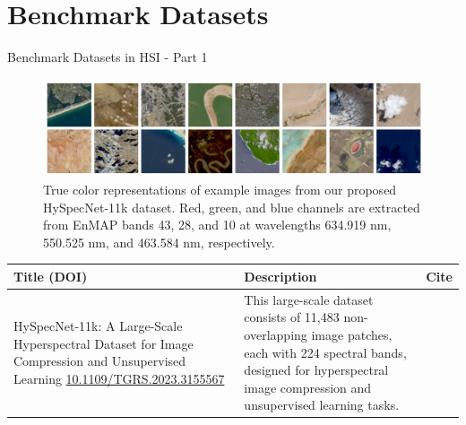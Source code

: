 \documentclass[10pt,svgnames,fragile]{beamer}
\begin{document}
\section{Benchmark Datasets}
\begin{frame}{Benchmark Datasets in HSI - Part 1}
\small
\begin{figure}
    \centering
    \includegraphics[width=1\linewidth]{HySpecNet_example.png}
    \caption{True color representations of example images from our proposed HySpecNet-11k dataset. Red, green, and blue channels are extracted from EnMAP bands 43, 28, and 10 at wavelengths 634.919 nm, 550.525 nm, and 463.584 nm, respectively.\cite{fuchsHySpecNet11kLargeScaleHyperspectral2023}}
    \label{fig:HySpecNet-example}
\end{figure}
\vspace{-1cm} %
\begin{table}[]
    \centering
    \begin{tabular}{|p{4.5cm}|p{6cm}|p{0.5cm}|}
        \hline
        \textbf{Title (DOI)} & \textbf{Description} & \textbf{Cite} \\ \hline
        HySpecNet-11k: A Large-Scale Hyperspectral Dataset for Image Compression and Unsupervised Learning \newline \href{https://consensus.app/papers/hyspecnet11k-largescale-hyperspectral-dataset-fuchs/86b52e4fcd0c50f6b4c0da950c6e4c11/?utm_source=chatgpt}{\color{blue}10.1109/TGRS.2023.3155567} & This large-scale dataset consists of 11,483 non-overlapping image patches, each with 224 spectral bands, designed for hyperspectral image compression and unsupervised learning tasks. & \cite{fuchsHySpecNet11kLargeScaleHyperspectral2023} \\ \hline
    \end{tabular}
\end{table}
\end{frame}
\end{document}
